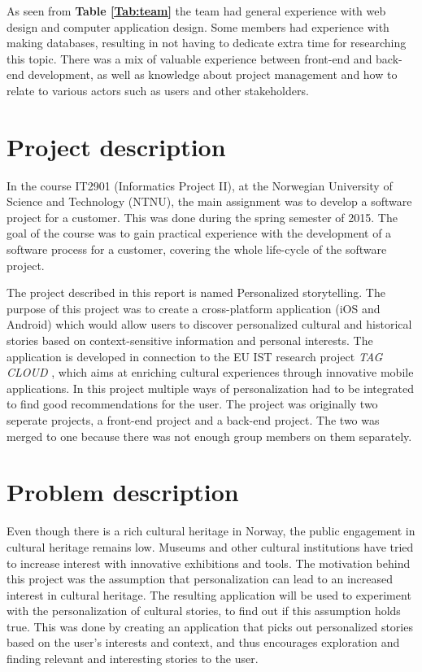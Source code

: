 As seen from \textbf{Table \ref{Tab:team}} the team had general experience with web design and computer application design. Some members had experience with making databases, resulting in not having to dedicate extra time for researching this topic. There was a mix of valuable experience between front-end and back-end development, as well as knowledge about project management and how to relate to various actors such as users and other stakeholders.

\section{Project description}

In the course IT2901 \cite{es20} (Informatics Project II), at the Norwegian University of Science and Technology (NTNU), the main assignment was to develop a software project for a customer. This was done during the spring semester of 2015. The goal of the course was to gain practical experience with the development of a software process for a customer, covering the whole life-cycle of the software project.\newline

The project described in this report is named Personalized storytelling. The purpose of this project was to create a cross-platform application (iOS and Android) which would allow users to discover personalized cultural and historical stories based on context-sensitive information and personal interests. The application is developed in connection to the EU IST research project \textit{TAG CLOUD} \cite{es21}, which aims at enriching cultural experiences through innovative mobile applications.
In this project multiple ways of personalization had to be integrated to find good recommendations for the user. The project was originally two seperate projects, a front-end project and a back-end project. The two was merged to one because there was not enough group members on them separately. 

\section{Problem description}

Even though there is a rich cultural heritage in Norway, the public engagement in cultural heritage remains low. Museums and other cultural institutions have tried to increase interest with innovative exhibitions and tools. The motivation behind this project was the assumption that personalization can lead to an increased interest in cultural heritage. The resulting application will be used to experiment with the personalization of cultural stories, to find out if this assumption holds true. This was done by creating an application that picks out personalized stories based on the user's interests and context, and thus encourages exploration and finding relevant and interesting stories to the user. \newline

